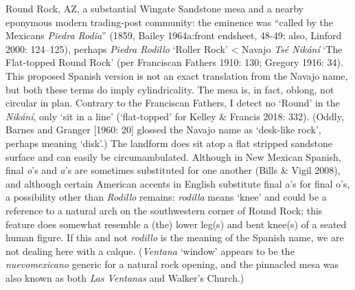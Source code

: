 Round Rock, AZ, a substantial Wingate Sandstone mesa and a nearby eponymous modern trading-post community:  the eminence was “called by the Mexicans \textit{Piedra Rodia}” (1859, Bailey 1964a:front endsheet, 48-49; also, Linford 2000: 124–125), perhaps \textit{Piedra Rodillo} ‘Roller Rock’ {\textless} Navajo \textit{Tsé Nikání} ‘The Flat-topped Round Rock’ (per Franciscan Fathers 1910: 130; Gregory 1916: 34).  This proposed Spanish version is not an exact translation from the Navajo name, but both these terms do imply cylindricality.  The mesa is, in fact, oblong, not circular in plan. Contrary to the Franciscan Fathers, I detect no `Round' in the \textit{Nikání}, only `sit in a line' (`flat-topped' for Kelley \& Francis 2018: 332). (Oddly, Barnes and Granger [1960: 20] glossed the Navajo name as ‘desk-like rock’, perhaps meaning `disk’.)  The landform does sit atop a flat stripped sandstone surface and can easily be circumambulated.  Although in New Mexican Spanish, final \textit{o}’s and \textit{a}’s are sometimes substituted for one another (Bills \& Vigil 2008), and although certain American accents in English substitute final a’s for final o’s, a possibility other than \textit{Rodillo} remains: \textit{rodilla} means ‘knee’ and could be a reference to a natural arch on the southwestern corner of Round Rock; this feature does somewhat resemble a (the) lower leg(s) and bent knee(s) of a seated human figure.  If this and not \textit{rodillo} is the meaning of the Spanish name, we are not dealing here with a calque.  (\textit{Ventana} ‘window’ appears to be the \textit{nuevomexicano} generic for a natural rock opening, and the pinnacled mesa was also known as both \textit{Las Ventanas} and Walker’s Church.)

